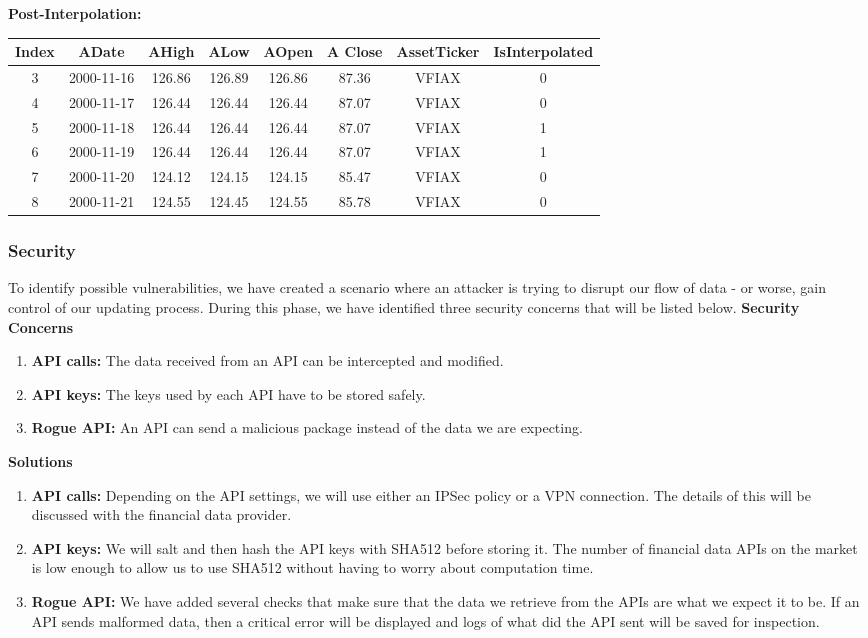 \documentclass[main.tex]{subfiles}
\begin{document}
\textbf{\newline Post-Interpolation: }
\begin{center}
    \begin{tabular}{||c c c c c c c c||} 
        \hline
        Index & ADate & AHigh & ALow & AOpen &A Close&AssetTicker&IsInterpolated\\ [0.5ex] 
        \hline\hline
        3&2000-11-16&126.86&126.89&126.86&87.36&VFIAX&0 \\ 
        \hline
        4&2000-11-17&126.44&126.44&126.44&87.07&VFIAX&0\\
        \hline
        5&2000-11-18&126.44&126.44&126.44&87.07&VFIAX&1
        \\
        \hline
        6&2000-11-19&126.44&126.44&126.44&87.07&VFIAX&1 \\
        \hline
        7&2000-11-20&124.12&124.15&124.15&85.47&VFIAX&0\\ 
        \hline
        8&2000-11-21&124.55&124.45&124.55&85.78&VFIAX&0\\
        \hline
    \end{tabular}
\end{center}

\subsubsection{Security}
To identify possible vulnerabilities, we have created a scenario where an attacker is trying to disrupt our flow of data - or worse, gain control of our updating process. During this phase, we have identified three security concerns that will be listed below. \newline
\textbf{Security Concerns}
\begin{enumerate}
    \item \textbf{API calls: }The data received from an API can be intercepted and modified.
    \item \textbf{API keys: }The keys used by each API have to be stored safely.
    \item \textbf{Rogue API: }An API can send a malicious package instead of the data we are expecting.
\end{enumerate}

\textbf{Solutions}
\begin{enumerate}
    \item \textbf{API calls: }Depending on the API settings, we will use either an IPSec policy or a VPN connection. The details of this will be discussed with the financial data provider.
    \item \textbf{API keys: }We will salt and then hash the API keys with SHA512 before storing it. The number of financial data APIs on the market is low enough to allow us to use SHA512 without having to worry about computation time.
    \item \textbf{Rogue API: }We have added several checks that make sure that the data we retrieve from the APIs are what we expect it to be. If an API sends malformed data, then a critical error will be displayed and logs of what did the API sent will be saved for inspection. 
\end{enumerate}
\end{document}
